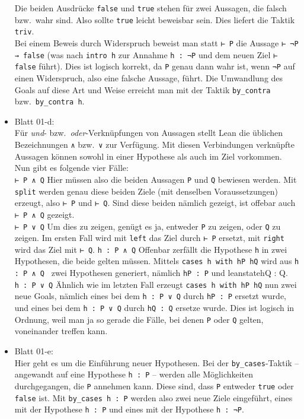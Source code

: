 \documentclass[11pt]{article}
\newcommand{\leanin}{\texttt}
\newcommand{\leanstate}{\texttt}
\begin{document}
\begin{itemize}
  Die beiden Ausdrücke \leanstate{false} und \leanstate{true} stehen für zwei Aussagen, die falsch bzw.\ wahr sind. Also sollte \leanstate{true} leicht beweisbar sein. Dies liefert die Taktik \leanin{triv}. \\
Bei einem Beweis durch Widerspruch beweist man statt \leanstate{⊢ P} die Aussage \leanstate{⊢ ¬P → false} (was nach \leanin{intro h} zur Annahme \leanstate{h : ¬P} und dem neuen Ziel \leanstate{⊢ false} führt). Dies ist logisch korrekt, da \leanstate{P} genau dann wahr ist, wenn \leanstate{¬P} auf einen Widerspruch, also eine falsche Aussage, führt. Die Umwandlung des Goals auf diese Art und Weise erreicht man mit der Taktik \leanin{by_contra} bzw.\ \leanin{by_contra h}. 
\item Blatt 01-d: \\
  Für {\em und}- bzw.\ {\em oder}-Verknüpfungen von Aussagen stellt Lean die üblichen Bezeichnungen \leanstate{∧} bzw.\ \leanstate{∨} zur Verfügung. Mit diesen Verbindungen verknüpfte Aussagen können sowohl in einer Hypothese als auch im Ziel vorkommen. Nun gibt es folgende vier Fälle:\\
  \leanstate{⊢ P ∧ Q} Hier müssen also die beiden Aussagen \leanstate{P} und \leanstate{Q} bewiesen werden. Mit \leanin{split} werden genau diese beiden Ziele (mit denselben Voraussetzungen) erzeugt, also \leanstate{⊢ P} und \leanstate{⊢ Q}. Sind diese beiden nämlich gezeigt, ist offebar auch \leanstate{⊢ P ∧ Q} gezeigt. \\
  \leanstate{⊢ P ∨ Q} Um dies zu zeigen, genügt es ja, entweder \leanstate{P} zu zeigen, oder \leanstate{Q} zu zeigen. Im ersten Fall wird mit \leanin{left} das Ziel durch \leanstate{⊢ P} ersetzt, mit \leanin{right} wird das Ziel mit \leanstate{⊢ Q}. 
  \leanstate{h : P ∧ Q} Offenbar zerfällt die Hypothese \leanstate{h} in zwei Hypothesen, die beide gelten müssen. Mittels \leanin{cases h with hP hQ} wird aus \leanstate{h : P ∧ Q } zwei Hypothesen generiert, nämlich \leanstate{hP : P} und leanstate{hQ : Q}.\\
  \leanstate{h : P ∨ Q} Ähnlich wie im letzten Fall erzeugt \leanin{cases h with hP hQ} nun zwei neue Goals, nämlich eines bei dem \leanstate{h : P ∨ Q} durch \leanstate{hP : P} ersetzt wurde, und eines bei dem \leanstate{h : P ∨ Q} durch \leanstate{hQ : Q} ersetze wurde. Dies ist logisch in Ordnung, weil man ja so gerade die Fälle, bei denen \leanstate{P} oder \leanstate{Q} gelten, voneinander treffen kann. 
\item Blatt 01-e: \\
  Hier geht es um die Einführung neuer Hypothesen. Bei der \leanin{by_cases}-Taktik -- angewandt auf eine Hypothese \leanstate{h : P} -- werden alle Möglichkeiten durchgegangen, die \leanstate{P} annehmen kann. Diese sind, dass \leanstate{P} entweder \leanstate{true} oder \leanstate{false} ist. Mit \leanin{by_cases h : P} werden also zwei neue Ziele eingeführt, eines mit der Hypothese \leanstate{h : P} und eines mit der Hypothese \leanstate{h : ¬P}. \\

\end{itemize}
\end{document}
